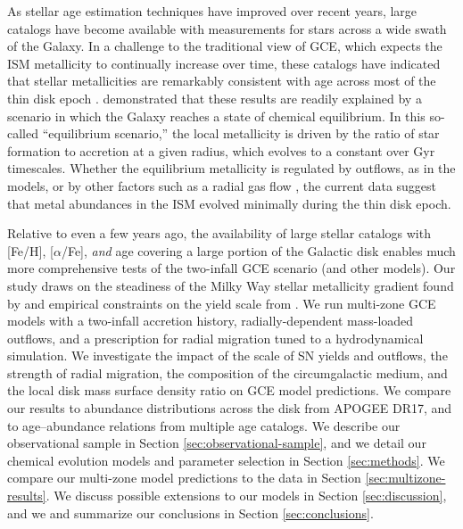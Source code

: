 \documentclass[twocolumn,twocolappendix,linenumbers]{aastex631}
\newcommand{\aFe}{[$\alpha$/Fe]\xspace}
\begin{document}
As stellar age estimation techniques have improved over recent years, large catalogs have become available with measurements for stars across a wide swath of the Galaxy. In a challenge to the traditional view of GCE, which expects the ISM metallicity to continually increase over time, these catalogs have indicated that stellar metallicities are remarkably consistent with age across most of the thin disk epoch \citep[e.g.,][]{spina_mapping_2022,magrini_gaia-eso_2023,willett_evolution_2023,carbajo-hijarrubia_occaso_2024,gallart_chronology_2024}. \citet{johnson_milky_2024} demonstrated that these results are readily explained by a scenario in which the Galaxy reaches a state of chemical equilibrium. In this so-called ``equilibrium scenario,'' the local metallicity is driven by the ratio of star formation to accretion at a given radius, which evolves to a constant over Gyr timescales. Whether the equilibrium metallicity is regulated by outflows, as in the  \citet{johnson_milky_2024} models, or by other factors such as a radial gas flow \citep{spitoni_effects_2011,bilitewski_radial_2012,sharda_interplay_2024}, the current data suggest that metal abundances in the ISM evolved minimally during the thin disk epoch.

Relative to even a few years ago, the availability of large stellar catalogs with [Fe/H], \aFe, {\it and} age covering a large portion of the Galactic disk enables much more comprehensive tests of the two-infall GCE scenario (and other models). Our study draws on the steadiness of the Milky Way stellar metallicity gradient found by \citet{johnson_milky_2024} and empirical constraints on the yield scale from \citet{weinberg_scale_2024}. We run multi-zone GCE models with a two-infall accretion history, radially-dependent mass-loaded outflows, and a prescription for radial migration tuned to a hydrodynamical simulation. We investigate the impact of the scale of SN yields and outflows, the strength of radial migration, the composition of the circumgalactic medium, and the local disk mass surface density ratio on GCE model predictions. We compare our results to abundance distributions across the disk from APOGEE DR17, and to age--abundance relations from multiple age catalogs. We describe our observational sample in Section \ref{sec:observational-sample}, and we detail our chemical evolution models and parameter selection in Section \ref{sec:methods}. We compare our multi-zone model predictions to the data in Section \ref{sec:multizone-results}. We discuss possible extensions to our models in Section \ref{sec:discussion}, and we and summarize our conclusions in Section \ref{sec:conclusions}.
\end{document}
